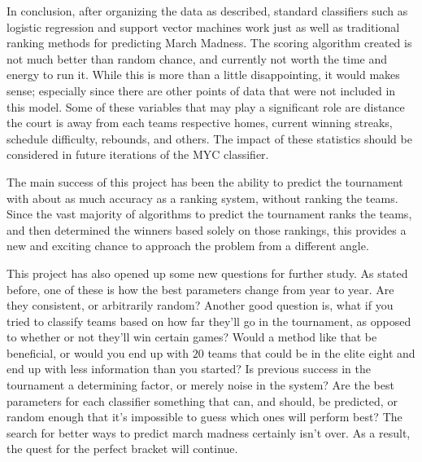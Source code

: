 In conclusion, after organizing the data as described, standard classifiers such as logistic regression and support vector machines work just as well as traditional ranking methods for predicting March Madness.  
The scoring algorithm created is not much better than random chance, and currently not worth the time and energy to run it.  
While this is more than a little disappointing, it would makes sense; especially since there are other points of data that were not included in this model.  
Some of these variables that may play a significant role are distance the court is away from each teams respective homes, current winning streaks, schedule difficulty, rebounds, and others.  
The impact of these statistics should be considered in future iterations of the MYC classifier.  

The main success of this project has been the ability to predict the tournament with about as much accuracy as a ranking system, without ranking the teams.  
Since the vast majority of algorithms to predict the tournament ranks the teams, and then determined the winners based solely on those rankings, this provides a new and exciting chance to approach the problem from a different angle.  

This project has also opened up some new questions for further study.  
As stated before, one of these is how the best parameters change from year to year.  
Are they consistent, or arbitrarily random?  
Another good question is, what if you tried to classify teams based on how far they'll go in the tournament, as opposed to whether or not they'll win certain games?  
Would a method like that be beneficial, or would you end up with $20$ teams that could be in the elite eight and end up with less information than you started?  
Is previous success in the tournament a determining factor, or merely noise in the system?  
Are the best parameters for each classifier something that can, and should, be predicted, or random enough that it's impossible to guess which ones will perform best?  
The search for better ways to predict march madness certainly isn't over.  
As a result, the quest for the perfect bracket will continue.